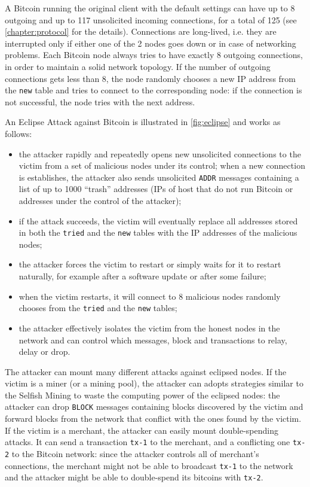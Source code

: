 A Bitcoin running the original client \cite{bitcoin_github} with the default settings can have up to \num{8} outgoing and up to \num{117} unsolicited incoming connections, for a total of \num{125} \cite{deanonymisation_2014, eclipse_attack_2015} (see \cref{chapter:protocol} for the details).
Connections are long-lived, i.e. they are interrupted only if either one of the \num{2} nodes goes down or in case of networking problems.
Each Bitcoin node always tries to have exactly \num{8} outgoing connections, in order to maintain a solid network topology.
If the number of outgoing connections gets less than \num{8}, the node randomly chooses a new IP address from the \texttt{new} table and tries to connect to the corresponding node:
if the connection is not successful, the node tries with the next address.

\bigskip
An Eclipse Attack against Bitcoin \cite{eclipse_attack_2015} is illustrated in \cref{fig:eclipse} and works as follows:
\begin{itemize}
	\item the attacker rapidly and repeatedly opens new unsolicited connections to the victim from a set of malicious nodes under its control; when a new connection is establishes, the attacker also sends unsolicited \texttt{ADDR} messages containing a list of up to \num{1000} ``trash'' addresses (IPs of host that do not run Bitcoin or addresses under the control of the attacker);
	\item if the attack succeeds, the victim will eventually replace all addresses stored in both the \texttt{tried} and the \texttt{new} tables with the IP addresses of the malicious nodes;
	\item the attacker forces the victim to restart \cite{cve_bloom_filter_2013, bitcoin_common_vulnerabilities} or simply waits for it to restart naturally, for example after a software update or after some failure;
	\item when the victim restarts, it will connect to \num{8} malicious nodes randomly chooses from the \texttt{tried} and the \texttt{new} tables;
	\item the attacker effectively isolates the victim from the honest nodes in the network and can control which messages, block and transactions to relay, delay or drop.
\end{itemize}

The attacker can mount many different attacks against eclipsed nodes.
If the victim is a miner (or a mining pool), the attacker can adopts strategies similar to the Selfish Mining to waste the computing power of the eclipsed nodes:
the attacker can drop \texttt{BLOCK} messages containing blocks discovered by the victim and forward blocks from the network that conflict with the ones found by the victim.
If the victim is a merchant, the attacker can easily mount double-spending attacks.
It can send a transaction \texttt{tx-1} to the merchant, and a conflicting one \texttt{tx-2} to the Bitcoin network:
since the attacker controls all of merchant's connections, the merchant might not be able to broadcast \texttt{tx-1} to the network and the attacker might be able to double-spend its bitcoins with \texttt{tx-2}.



